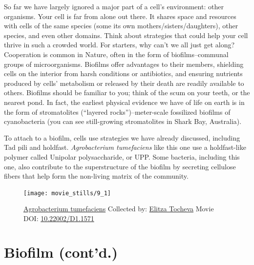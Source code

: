 \documentclass[]{tufte-book}
\begin{document}
So far we have largely ignored a major part of a cell's environment:
other organisms. Your cell is far from alone out there. It shares space
and resources with cells of the same species (some its own
mothers/sisters/daughters), other species, and even other domains. Think
about strategies that could help your cell thrive in such a crowded
world. For starters, why can't we all just get along? Cooperation is
common in Nature, often in the form of biofilms--communal groups of
microorganisms. Biofilms offer advantages to their members, shielding
cells on the interior from harsh conditions or antibiotics, and ensuring
nutrients produced by cells' metabolism or released by their death are
readily available to others. Biofilms should be familiar to you; think
of the scum on your teeth, or the nearest pond. In fact, the earliest
physical evidence we have of life on earth is in the form of
stromatolites (``layered rocks'')--meter-scale fossilized biofilms of
cyanobacteria (you can see still-growing stromatolites in Shark Bay,
Australia).

To attach to a biofilm, cells use strategies we have already discussed,
including Tad pili and holdfast. \emph{Agrobacterium tumefaciens} like
this one use a holdfast-like polymer called Unipolar polysaccharide, or
UPP. Some bacteria, including this one, also contribute to the
superstructure of the biofilm by secreting cellulose fibers that help
form the non-living matrix of the community.





\begin{figure}
\texttt{[image: movie\_stills/9\_1]} \caption[\protect\hyperlink{tree}{Agrobacterium tumefaciens} Collected
by: \protect\hyperlink{elitza_tocheva}{Elitza Tocheva} Movie DOI:
\href{https://doi.org/10.22002/D1.1571}{10.22002/D1.1571}]{\protect\hyperlink{tree}{Agrobacterium tumefaciens} Collected
by: \protect\hyperlink{elitza_tocheva}{Elitza Tocheva} Movie DOI:
\href{https://doi.org/10.22002/D1.1571}{10.22002/D1.1571}}\label{fig:9-1}
\end{figure}

\section{Biofilm (cont'd.)}\label{biofilm-contd.}
\end{document}
